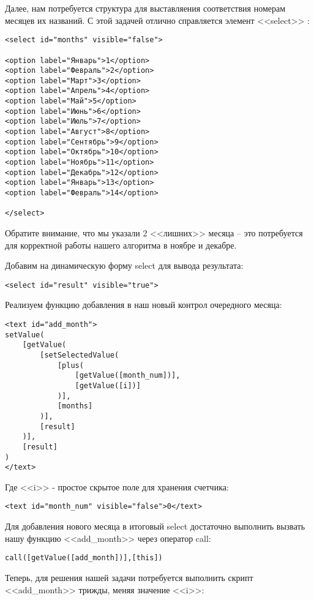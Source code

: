 \documentclass[10pt]{book}
\begin{document}
Далее, нам потребуется структура для выставляения соответствия номерам месяцев их названий. С этой задачей отлично справляется элемент <<select>> :

\begin{verbatim}
<select id="months" visible="false"> 

<option label="Январь">1</option>
<option label="Февраль">2</option>
<option label="Март">3</option>
<option label="Апрель">4</option>
<option label="Май">5</option>
<option label="Июнь">6</option>
<option label="Июль">7</option>
<option label="Август">8</option>
<option label="Сентябрь">9</option>
<option label="Октябрь">10</option>
<option label="Ноябрь">11</option>
<option label="Декабрь">12</option>
<option label="Январь">13</option>
<option label="Февраль">14</option>

</select>
\end{verbatim}

Обратите внимание, что мы указали 2 <<лишних>> месяца -- это потребуется для корректной работы нашего алгоритма в ноябре и декабре.

Добавим на динамическую форму select для вывода результата:
\begin{verbatim}
<select id="result" visible="true"> 
\end{verbatim}

Реализуем функцию добавления в наш новый контрол очередного месяца:

\begin{verbatim}
<text id="add_month">
setValue(
    [getValue(
        [setSelectedValue(
            [plus(
                [getValue([month_num])],
                [getValue([i])]
            )], 
            [months]
        )],
        [result]
    )],
    [result]
)
</text>
\end{verbatim}

Где <<i>> - простое скрытое поле для хранения счетчика:
\begin{verbatim}
<text id="month_num" visible="false">0</text>
\end{verbatim}

Для добавления нового месяца в итоговый select достаточно выполнить вызвать нашу функцию <<add\_month>> через оператор call: 

\begin{verbatim}
call([getValue([add_month])],[this])
\end{verbatim}

Теперь, для решения нашей задачи потребуется выполнить скрипт <<add\_month>> трижды, меняя значение <<i>>:
\end{document}
